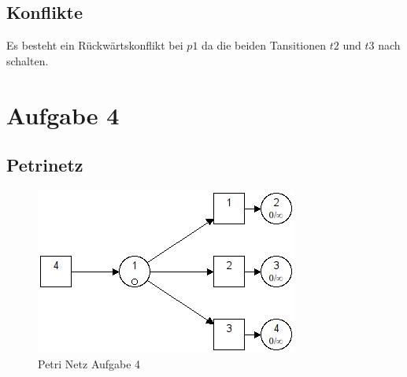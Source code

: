 \documentclass[10pt]{scrartcl}
\begin{document}
	\subsection{Konflikte}
	Es besteht ein Rückwärtskonflikt bei $p1$ da die beiden Tansitionen $t2$ und $t3$ nach schalten.
	
\section{Aufgabe 4}
	\subsection{Petrinetz}
	\begin{figure}[h]
    		\centering
			\includegraphics[]{aufg4.png}		
            \caption{Petri Netz Aufgabe 4}
            \label{petri:aufg4}
	\end{figure}
\end{document}

